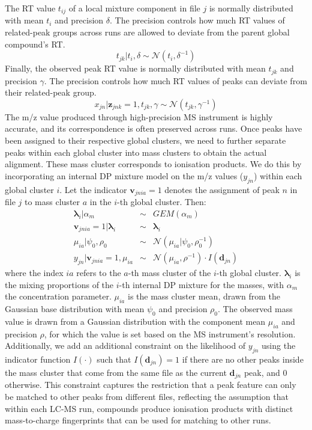 The RT value $t_{ij}$ of a local mixture component in file $j$ is normally distributed with mean $t_{i}$ and precision $\delta$. The precision controls how much RT values of related-peak groups across runs are allowed to deviate from the parent global compound's RT. 
\begin{equation}
	t_{jk}|t_{i},\delta\sim\mathcal{N}(t_{i},\delta^{-1})\label{eq:draw_tik}
\end{equation}
Finally, the observed peak RT value is normally distributed with mean $t_{jk}$ and precision $\gamma$. The precision controls how much RT values of peaks can deviate from their related-peak group. 
\begin{equation}
	x_{jn}|\boldsymbol{z}_{jnk}=1,t_{jk},\gamma\sim\mathcal{N}(t_{jk},\gamma^{-1})\label{eq:peakdist}
\end{equation}
The m/z value produced through high-precision MS instrument is highly accurate, and its correspondence is often preserved across runs. Once peaks have been assigned to their respective global clusters, we need to further separate peaks within each global cluster into mass clusters to obtain the actual alignment. These mass cluster corresponds to ionisation products. We do this by incorporating an internal DP mixture model on the m/z values ($y_{jn}$) within each global cluster $i$. Let the
indicator $\boldsymbol{v}_{jnia}=1$ denotes the assignment of peak $n$ in file $j$ to mass cluster $a$ in the $i$-th global cluster. Then: 
\begin{eqnarray}
	\boldsymbol{\lambda}_{i}|\alpha_{m} & \sim & GEM(\alpha_{m})\\
	\boldsymbol{v}_{jnia}=1|\boldsymbol{\lambda}_{i} & \sim & \boldsymbol{\lambda}_{i}\\
	\mu_{ia}|\psi_{0},\rho_{0} & \sim & \mathcal{N}(\mu_{ia}|\psi_{0},\rho_{0}^{-1})\\
	y_{jn}|\boldsymbol{v}_{jnia}=1,\mu_{ia} & \sim & \mathcal{N}(\mu_{ia},\rho^{-1})\cdot I(\mathbf{d}_{jn})
\end{eqnarray}
where the index $ia$ refers to the $a$-th mass cluster of the $i$-th global cluster. $\boldsymbol{\lambda}_{i}$ is the mixing proportions of the $i$-th internal DP mixture for the masses, with $\alpha_{m}$ the concentration parameter. $\mu_{ia}$ is the mass cluster mean, drawn from the Gaussian base distribution with mean $\psi_{0}$ and precision $\rho_{0}$. The observed mass value is drawn from a Gaussian distribution with the component mean $\mu_{ia}$ and precision $\rho$, for which the value is set based on the MS instrument's resolution. Additionally, we add an additional constraint on the likelihood of $y_{jn}$ using the indicator function $I(\cdot)$ such that $I(\mathbf{d}_{jn})=1$ if there are no other peaks inside the mass cluster that come from the same file as the current $\mathbf{d}_{jn}$ peak, and $0$ otherwise. This constraint captures the restriction that a peak feature can only be matched to other peaks from different files, reflecting the assumption that within each LC-MS run, compounds produce ionisation products with distinct mass-to-charge fingerprints that can be used for matching to other runs.

